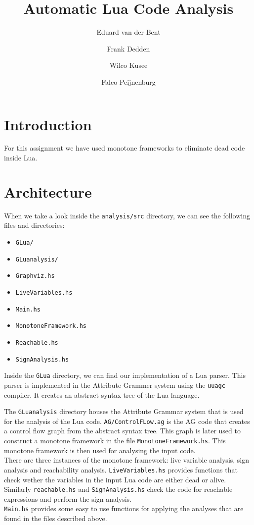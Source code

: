 \documentclass[10pt]{article}
\title{Automatic Lua Code Analysis}
\author{Eduard van der Bent \and Frank Dedden \and Wilco Kusee \and Falco Peijnenburg}
\begin{document}
\maketitle


\section{Introduction}

For this assignment we have used monotone frameworks to eliminate dead code inside Lua.

\section{Architecture} %
When we take a look inside the \texttt{analysis/src} directory, we can see the following files and directories:
\begin{itemize}
    \item \texttt{GLua/}
    \item \texttt{GLuanalysis/}
    \item \texttt{Graphviz.hs}
    \item \texttt{LiveVariables.hs}
    \item \texttt{Main.hs}
    \item \texttt{MonotoneFramework.hs}
    \item \texttt{Reachable.hs}
    \item \texttt{SignAnalysis.hs}
\end{itemize}

Inside the \texttt{GLua} directory, we can find our implementation of a Lua parser. This parser is implemented in the Attribute Grammer system using the \texttt{uuagc} compiler. It creates an abstract syntax tree of the Lua language. %

The \texttt{GLuanalysis} directory houses the Attribute Grammar system that is used for the analysis of the Lua code. \texttt{AG/ControlFLow.ag} is the AG code that creates a control flow graph from the abstract syntax tree. This graph is later used to construct a monotone framework in the file \texttt{MonotoneFramework.hs}. This monotone framework is then used for analysing the input code.\\
There are three instances of the monotone framework: live variable analysis, sign analysis and reachability analysis.
\texttt{LiveVariables.hs} provides functions that check wether the variables in the input Lua code are either dead or alive.\\
Similarly \texttt{reachable.hs} and \texttt{SignAnalysis.hs} check the code for reachable expressions and perform the sign analysis.\\
\texttt{Main.hs} provides some easy to use functions for applying the analyses that are found in the files described above.
\end{document}
